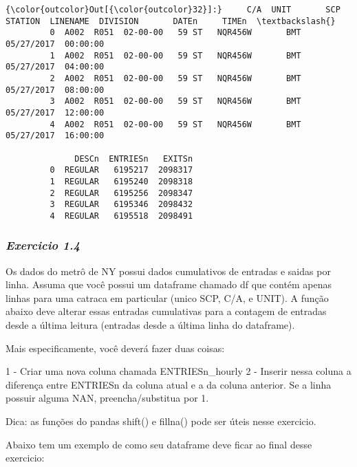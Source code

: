 \documentclass[11pt]{article}
\begin{document}
\begin{Verbatim}[commandchars=\\\{\}]
{\color{outcolor}Out[{\color{outcolor}32}]:}     C/A  UNIT       SCP STATION  LINENAME  DIVISION       DATEn     TIMEn  \textbackslash{}
         0  A002  R051  02-00-00   59 ST   NQR456W       BMT  05/27/2017  00:00:00   
         1  A002  R051  02-00-00   59 ST   NQR456W       BMT  05/27/2017  04:00:00   
         2  A002  R051  02-00-00   59 ST   NQR456W       BMT  05/27/2017  08:00:00   
         3  A002  R051  02-00-00   59 ST   NQR456W       BMT  05/27/2017  12:00:00   
         4  A002  R051  02-00-00   59 ST   NQR456W       BMT  05/27/2017  16:00:00   
         
              DESCn  ENTRIESn   EXITSn  
         0  REGULAR   6195217  2098317  
         1  REGULAR   6195240  2098318  
         2  REGULAR   6195256  2098347  
         3  REGULAR   6195346  2098432  
         4  REGULAR   6195518  2098491  
\end{Verbatim}
            
    \subsubsection{\texorpdfstring{\emph{Exercicio
1.4}}{Exercicio 1.4}}\label{exercicio-1.4}

Os dados do metrô de NY possui dados cumulativos de entradas e saidas
por linha. Assuma que você possui um dataframe chamado df que contém
apenas linhas para uma catraca em particular (unico SCP, C/A, e UNIT). A
função abaixo deve alterar essas entradas cumulativas para a contagem de
entradas desde a última leitura (entradas desde a última linha do
dataframe).

Mais especificamente, você deverá fazer duas coisas:

1 - Criar uma nova coluna chamada ENTRIESn\_hourly 2 - Inserir nessa
coluna a diferença entre ENTRIESn da coluna atual e a da coluna
anterior. Se a linha possuir alguma NAN, preencha/substitua por 1.

Dica: as funções do pandas shift() e fillna() pode ser úteis nesse
exercicio.

Abaixo tem um exemplo de como seu dataframe deve ficar ao final desse
exercicio:
\end{document}
